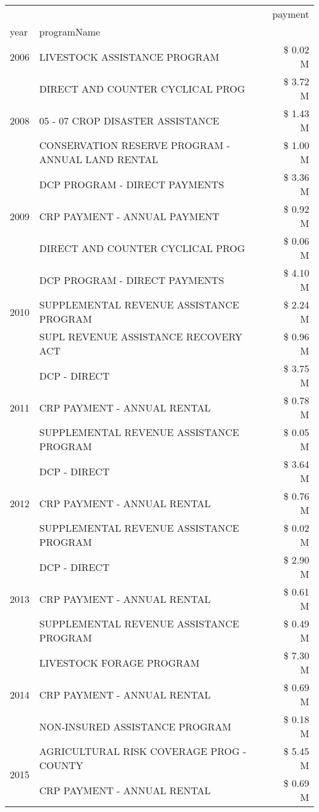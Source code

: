 \begin{tabular}{llr}
\toprule
 &  & payment \\
year & programName &  \\
\midrule
2006 & LIVESTOCK ASSISTANCE PROGRAM & \$ 0.02 M \\
\cline{1-3}
\multirow[t]{3}{*}{2008} & DIRECT AND COUNTER CYCLICAL PROG & \$ 3.72 M \\
 & 05 - 07 CROP DISASTER ASSISTANCE & \$ 1.43 M \\
 & CONSERVATION RESERVE PROGRAM - ANNUAL LAND RENTAL & \$ 1.00 M \\
\cline{1-3}
\multirow[t]{3}{*}{2009} & DCP PROGRAM - DIRECT PAYMENTS & \$ 3.36 M \\
 & CRP PAYMENT - ANNUAL PAYMENT & \$ 0.92 M \\
 & DIRECT AND COUNTER CYCLICAL PROG & \$ 0.06 M \\
\cline{1-3}
\multirow[t]{3}{*}{2010} & DCP PROGRAM - DIRECT PAYMENTS & \$ 4.10 M \\
 & SUPPLEMENTAL REVENUE ASSISTANCE PROGRAM & \$ 2.24 M \\
 & SUPL REVENUE ASSISTANCE RECOVERY ACT & \$ 0.96 M \\
\cline{1-3}
\multirow[t]{3}{*}{2011} & DCP - DIRECT & \$ 3.75 M \\
 & CRP PAYMENT - ANNUAL RENTAL & \$ 0.78 M \\
 & SUPPLEMENTAL REVENUE ASSISTANCE PROGRAM & \$ 0.05 M \\
\cline{1-3}
\multirow[t]{3}{*}{2012} & DCP - DIRECT & \$ 3.64 M \\
 & CRP PAYMENT - ANNUAL RENTAL & \$ 0.76 M \\
 & SUPPLEMENTAL REVENUE ASSISTANCE PROGRAM & \$ 0.02 M \\
\cline{1-3}
\multirow[t]{3}{*}{2013} & DCP - DIRECT & \$ 2.90 M \\
 & CRP PAYMENT - ANNUAL RENTAL & \$ 0.61 M \\
 & SUPPLEMENTAL REVENUE ASSISTANCE PROGRAM & \$ 0.49 M \\
\cline{1-3}
\multirow[t]{3}{*}{2014} & LIVESTOCK FORAGE PROGRAM & \$ 7.30 M \\
 & CRP PAYMENT - ANNUAL RENTAL & \$ 0.69 M \\
 & NON-INSURED ASSISTANCE PROGRAM & \$ 0.18 M \\
\cline{1-3}
\multirow[t]{3}{*}{2015} & AGRICULTURAL RISK COVERAGE PROG - COUNTY & \$ 5.45 M \\
 & CRP PAYMENT - ANNUAL RENTAL & \$ 0.69 M \\

\end{tabular}
